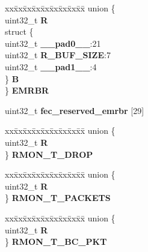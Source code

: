 \begin{DoxyCompactItemize}
\begin{tabbing}
\end{tabbing}\item 
\mbox{\label{structFEC__tag_a3f83308dcd4925360557d6ce861c566f}} 
\begin{tabbing}
xx\=xx\=xx\=xx\=xx\=xx\=xx\=xx\=xx\=\kill
union \{\\
\>uint32\_t {\bfseries R}\\
\>struct \{\\
\>\>uint32\_t {\bfseries \_\_pad0\_\_}:21\\
\>\>uint32\_t {\bfseries R\_BUF\_SIZE}:7\\
\>\>uint32\_t {\bfseries \_\_pad1\_\_}:4\\
\>\} {\bfseries B}\\
\} {\bfseries EMRBR}\\

\end{tabbing}\item 
\mbox{\label{structFEC__tag_a8f9cc5ffaca5e82bc0b32b748aecf38f}} 
uint32\+\_\+t {\bfseries fec\+\_\+reserved\+\_\+emrbr} \mbox{[}29\mbox{]}
\item 
\mbox{\label{structFEC__tag_a0ab248045946142ea2002fc9ec9d09bf}} 
\begin{tabbing}
xx\=xx\=xx\=xx\=xx\=xx\=xx\=xx\=xx\=\kill
union \{\\
\>uint32\_t {\bfseries R}\\
\} {\bfseries RMON\_T\_DROP}\\

\end{tabbing}\item 
\mbox{\label{structFEC__tag_a0e521dcb22c5f41b7c728313c5771314}} 
\begin{tabbing}
xx\=xx\=xx\=xx\=xx\=xx\=xx\=xx\=xx\=\kill
union \{\\
\>uint32\_t {\bfseries R}\\
\} {\bfseries RMON\_T\_PACKETS}\\

\end{tabbing}\item 
\mbox{\label{structFEC__tag_ac153cb4d144781f149ba8d279645a002}} 
\begin{tabbing}
xx\=xx\=xx\=xx\=xx\=xx\=xx\=xx\=xx\=\kill
union \{\\
\>uint32\_t {\bfseries R}\\
\} {\bfseries RMON\_T\_BC\_PKT}\\


\end{tabbing}
\end{DoxyCompactItemize}
